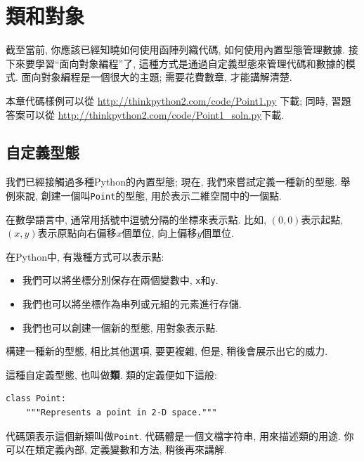 \documentclass[10pt]{book}
\begin{document}
\chapter{類和對象}
\label{clobjects}

截至當前, 你應該已經知曉如何使用函陣列織代碼, 
如何使用內置型態管理數據. 
接下來要學習``面向對象編程''了, 
這種方式是通過自定義型態來管理代碼和數據的模式. 
面向對象編程是一個很大的主題; 需要花費數章, 才能講解清楚. 

本章代碼樣例可以從
\url{http://thinkpython2.com/code/Point1.py} 下載;
同時, 習題答案可以從
\url{http://thinkpython2.com/code/Point1_soln.py}下載.


\section{自定義型態}
\label{point}

我們已經接觸過多種Python的內置型態;
現在, 我們來嘗試定義一種新的型態. 
舉例來說, 創建一個叫{\tt Point}的型態, 用於表示二維空間中的一個點. 

在數學語言中, 通常用括號中逗號分隔的坐標來表示點. 
比如, $(0,0)$表示起點, $(x,y)$表示原點向右偏移$x$個單位, 
向上偏移$y$個單位. 

在Python中, 有幾種方式可以表示點:

\begin{itemize}

\item 我們可以將坐標分別保存在兩個變數中, {\tt x}和{\tt y}. 

\item 我們也可以將坐標作為串列或元組的元素進行存儲. 

\item 我們也可以創建一個新的型態, 用對象表示點. 

\end{itemize}

構建一種新的型態, 相比其他選項, 要更複雜, 
但是, 稍後會展示出它的威力. 

這種自定義型態, 也叫做{\bf 類}. 
類的定義便如下這般:

\begin{verbatim}
class Point:
    """Represents a point in 2-D space."""
\end{verbatim}
%
代碼頭表示這個新類叫做{\tt Point}. 
代碼體是一個文檔字符串, 用來描述類的用途. 
你可以在類定義內部, 定義變數和方法, 
稍後再來講解. 
\end{document}
